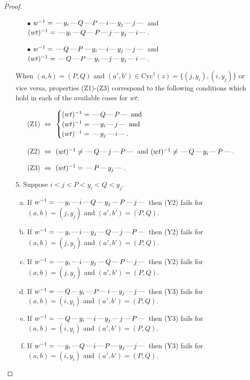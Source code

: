 \documentclass[10pt]{article}
\theoremstyle{definition}
\theoremstyle{definition}
\def\dash{\text{\hspace{0.5mm}---\hspace{0.5mm}}}
\def\Cyc{\mathrm{Cyc}}
\begin{document}
\begin{proof}
\begin{enumerate}
\begin{enumerate}
\item[$\bullet$] $w^{-1} = \dash y_i\dash Q\dash P\dash i\dash y_j\dash j\dash $ and $(wt)^{-1} = \dash y_i\dash Q\dash P\dash j\dash y_j\dash i\dash $.
\item[$\bullet$] $w^{-1} = \dash Q\dash P\dash y_i\dash i\dash y_j\dash j\dash $ and $(wt)^{-1} = \dash Q\dash P\dash y_i\dash j\dash y_j\dash i\dash $.
\end{enumerate}
When $(a,b)= (P,Q)$ and $(a',b')\in \Cyc^1(z)=\{(j,y_i),(i,y_j)\}$ or vice versa,
properties (Z1)-(Z3) correspond to the following conditions which
hold in each of the available cases for $wt$:
\begin{enumerate}
\item[](Z1) $\Leftrightarrow$ $\begin{cases}\text{$(wt)^{-1} = \dash Q \dash P \dash$}\text{ and }\\
\text{$(wt)^{-1} = \dash y_i \dash j \dash$}\text{ and }\\
\text{$(wt)^{-1} = \dash y_j \dash i \dash$}.\end{cases}$
\item[](Z2) $\Leftrightarrow$ $(wt)^{-1} \neq \dash Q \dash j \dash P \dash$ and $(wt)^{-1}\neq \dash Q \dash y_i \dash P \dash$.
\item[](Z3) $\Leftrightarrow$ $(wt)^{-1} = \dash P \dash y_j \dash$.
\end{enumerate}
\item[$5$.] Suppose $i < j < P < y_i < Q < y_j$.
\begin{enumerate}[(a)]
\item If $w^{-1} = \dash y_i\dash i\dash Q\dash y_j\dash P\dash j\dash $ then (Y2) fails for $(a,b)=(j,y_j)$ and $(a',b')=(P,Q)$.
\item If $w^{-1} = \dash y_i\dash i\dash y_j\dash Q\dash j\dash P\dash $ then (Y2) fails for $(a,b)=(j,y_j)$ and $(a',b')=(P,Q)$.
\item If $w^{-1} = \dash y_i\dash i\dash y_j\dash Q\dash P\dash j\dash $ then (Y2) fails for $(a,b)=(j,y_j)$ and $(a',b')=(P,Q)$.
\item If $w^{-1} = \dash Q\dash y_i\dash P\dash i\dash y_j\dash j\dash $ then (Y3) fails for $(a,b)=(i,y_i)$ and $(a',b')=(P,Q)$.
\item If $w^{-1} = \dash Q\dash y_i\dash i\dash y_j\dash j\dash P\dash $ then (Y3) fails for $(a,b)=(i,y_i)$ and $(a',b')=(P,Q)$.
\item If $w^{-1} = \dash y_i\dash Q\dash i\dash P\dash y_j\dash j\dash $ then (Y3) fails for $(a,b)=(i,y_i)$ and $(a',b')=(P,Q)$.

\end{enumerate}
\end{enumerate}
\end{proof}
\end{document}
